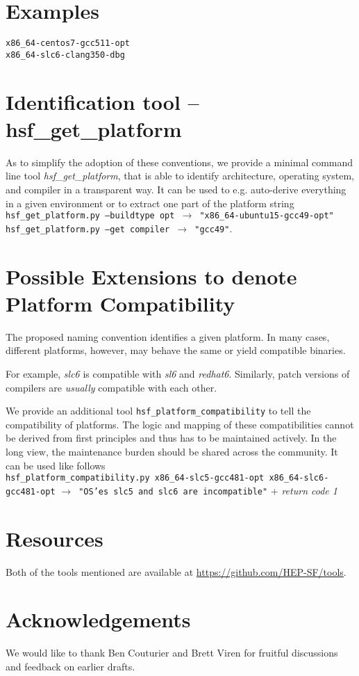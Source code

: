 \documentclass[12pt,a4paper]{article}
\begin{document}
\section{Examples}
\texttt{x86\_64-centos7-gcc511-opt}
\\
\texttt{x86\_64-slc6-clang350-dbg}


\section{Identification tool -- hsf\_get\_platform}
As to simplify the adoption of these conventions, we provide a minimal command line tool \emph{hsf\_get\_platform}, that is able to identify architecture, operating system, and compiler in a transparent way. It can be used to e.g. auto-derive everything in a given environment or to extract one part of the platform string
\\
\texttt{hsf\_get\_platform.py --buildtype opt $\rightarrow$ "x86\_64-ubuntu15-gcc49-opt"}
\\
\texttt{hsf\_get\_platform.py --get compiler $\rightarrow$ "gcc49"}.

\section{Possible Extensions to denote Platform Compatibility}
The proposed naming convention identifies a given platform. In many cases, different platforms, however, may behave the same or yield compatible binaries. 

For example, \emph{slc6} is compatible with \emph{sl6} and \emph{redhat6}. Similarly, patch versions of compilers are \emph{usually} compatible with each other.

We provide an additional tool \texttt{hsf\_platform\_compatibility} to tell the compatibility of platforms. The logic and mapping of these compatibilities cannot be derived from first principles and thus has to be maintained actively. In the long view, the maintenance burden should be shared across the community. It can be used like follows
\\
\newline
\texttt{hsf\_platform\_compatibility.py x86\_64-slc5-gcc481-opt x86\_64-slc6-gcc481-opt}
\newline 
\texttt{$\rightarrow$ "OS'es slc5 and slc6 are incompatible"} + \emph{return code 1}

\section{Resources}
Both of the tools mentioned are available at \url{https://github.com/HEP-SF/tools}. 

\section*{Acknowledgements}
We would like to thank Ben Couturier and Brett Viren for fruitful discussions and feedback on earlier drafts.
\end{document}

